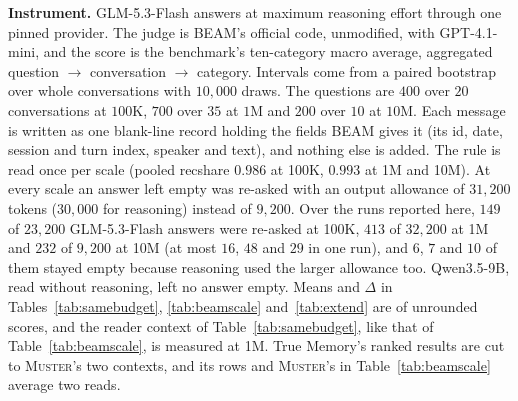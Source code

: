 \documentclass{article}
\newcommand{\sys}{\textsc{Muster}}
\newcommand{\cov}{\textsf{recshare}}
\begin{document}
\textbf{Instrument.} GLM-5.3-Flash answers at maximum reasoning effort through one
pinned provider. The judge is BEAM's official code, unmodified, with GPT-4.1-mini, and the score is the benchmark's
ten-category macro average, aggregated question $\rightarrow$ conversation $\rightarrow$ category.
Intervals come from a paired bootstrap over whole conversations with $10{,}000$ draws. The questions are $400$ over $20$
conversations at $100$K, $700$ over $35$ at $1$M and $200$ over $10$ at $10$M. Each message is written as one blank-line record holding the fields BEAM gives it (its id, date, session and turn index, speaker and text), and nothing else is added. The rule is read once per scale (pooled \cov{} $0.986$ at 100K,
$0.993$ at 1M and 10M). At every scale an answer left empty was re-asked with an output allowance of $31{,}200$ tokens ($30{,}000$ for reasoning) instead of $9{,}200$. Over the runs reported here, $149$ of $23{,}200$ GLM-5.3-Flash answers were re-asked at 100K, $413$ of $32{,}200$ at 1M and $232$ of $9{,}200$ at 10M (at most $16$, $48$ and $29$ in one run), and $6$, $7$ and $10$ of them stayed empty because reasoning used the larger allowance too. Qwen3.5-9B, read without reasoning, left no answer empty. Means and $\Delta$ in Tables~\ref{tab:samebudget}, \ref{tab:beamscale} and~\ref{tab:extend} are of unrounded scores, and the reader context of Table~\ref{tab:samebudget}, like that of Table~\ref{tab:beamscale}, is measured at 1M. True Memory's ranked results are cut to \sys{}'s two contexts, and its rows and \sys{}'s in Table~\ref{tab:beamscale} average two reads.
\end{document}
